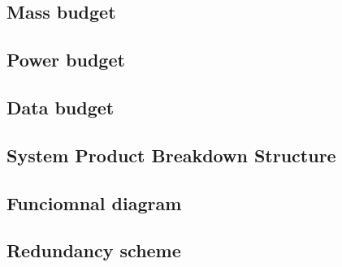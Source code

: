\subsection{Mass budget}
\subsection{Power budget}
\subsection{Data budget}
\subsection{System Product Breakdown Structure}
\subsection{Funciomnal diagram} 
\subsection{Redundancy scheme}

